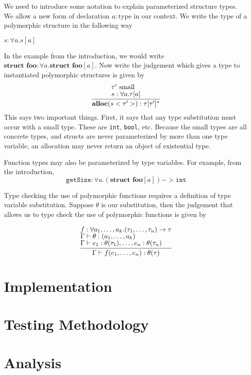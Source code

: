 \documentclass[aps,letterpaper,11pt]{revtex4}
\begin{document}
We need to introduce some notation to explain parameterized structure types. We allow a new form of declaration
$a : \text{type}$ in our context. We write the type of a polymorphic structure in the following way

\begin{center}
$s : \forall a. s[a]$
\end{center}

In the example from the introduction, we would write $\textbf{struct foo} : \forall a. \textbf{struct foo}[a]$.
Now write the judgement which gives a type to instantiated polymorphic structures is given by
\[
\begin{tabular}{c}
  \infer{\textbf{alloc}(s <\tau'>) : \tau[\tau']^*}
        {	
        	{\tau'~\text{small}} \vspace{.1cm}\\
			{s : \forall a. \tau[a]}
        }
\end{tabular}
\]
This says two important things. First, it says that any type substitution must occur with a small type.
These are \texttt{int}, \texttt{bool}, etc. Because the small types are all concrete types, and structs are
never parameterized by more than one type variable, an allocation may never return an object of
existential type.

Function types may also be parameterized by type variables. For example, from the introduction,
$$\texttt{getSize} : \forall a. (\textbf{struct foo}[a]) -> \texttt{int}$$

Type checking the use of polymorphic functions requires a definition of type variable substitution. Suppose
$\theta$ is our substitution, then the judgement that allows us to type check the use of polymorphic
functions is given by

\[
\begin{tabular}{c}
  \infer{\Gamma \vdash f(e_1, \ldots, e_n) : \theta(\tau)}
        {	
        	{f : \forall a_1, \ldots, a_k. (\tau_1, \ldots, \tau_n) \rightarrow \tau}\\
			{\Gamma \vdash \theta : (a_1, \ldots, a_k)}\\
			{\Gamma \vdash e_1 : \theta(\tau_1), \ldots, e_n : \theta(\tau_n)}
        }
\end{tabular}
\]

\newpage
\section{Implementation}

\newpage
\section{Testing Methodology}

\newpage
\section{Analysis}
\end{document}

